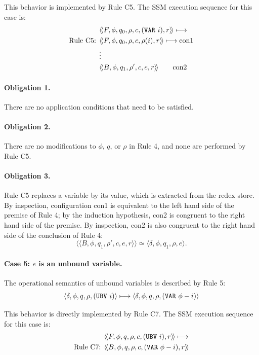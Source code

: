This behavior is implemented by Rule C5. The SSM execution sequence for this
case is:
\begin{align*}
&\langle\!\langle F,\phi,q_0,\rho,c,(\THOR{VAR}\ i),r\rangle\!\rangle
\longmapsto\\
\text{Rule C5: }&
\langle\!\langle F,\phi,q_0,\rho,c,\rho(i),r\rangle\!\rangle
\longmapsto \mathrm{con1}\\
&\vdots\\
&\langle\!\langle B,\phi,q_1,\rho',c,e,r\rangle\!\rangle
\qquad \mathrm{con2}
\end{align*}

\paragraph{Obligation 1.} There are no application conditions that need to be
satisfied.

\paragraph{Obligation 2.} There are no modifications to \(\phi\), \(q\), or
\(\rho\) in Rule 4, and none are performed by Rule C5.

\paragraph{Obligation 3.} Rule C5 replaces a variable by its value, which is
extracted from the redex store. By inspection, configuration con1 is equivalent
to the left hand side of the premise of Rule 4; by the induction hypothesis,
con2 is congruent to the right hand side of the premise. By inspection, con2 is
also congruent to the right hand side of the conclusion of Rule 4:
\[
\langle\!\langle B,\phi,q_1,\rho',c,e,r\rangle\!\rangle
\simeq
\langle \delta,\phi,q_1,\rho,e\rangle.
\]

\paragraph{Case 5: \(e\) is an unbound variable.}
The operational semantics of unbound variables is described by Rule 5:
\[
\langle \delta,\phi,q,\rho,(\THOR{UBV}\ i)\rangle
\longmapsto
\langle \delta,\phi,q,\rho,(\THOR{VAR}\ \phi-i)\rangle
\]

This behavior is directly implemented by Rule C7. The SSM execution sequence
for this case is:
\begin{align*}
&\langle\!\langle F,\phi,q,\rho,c,(\texttt{UBV}\ i),r\rangle\!\rangle
\longmapsto\\
\text{Rule C7: }&
\langle\!\langle B,\phi,q,\rho,c,(\texttt{VAR}\ \phi-i),r\rangle\!\rangle
\end{align*}

